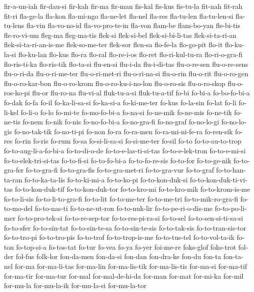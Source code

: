 {fir-a-un-iah fir-dau-si fir-kah fir-ma fir-man fis-kal fis-kus fis-tu-la
fit-nah fit-rah fit-ri fla-ge-la fla-kon fla-mi-ngo fla-ne-let fla-nel
fla-res fla-tu-len fla-tu-len-si fla-tu-lens fla-vin fla-vo-no-id
fla-vo-pro-te-in fla-von flam-be flam-bo-yan fle-bi-tis fle-ro-vi-um
fleg-ma fleg-ma-tis flek-si flek-si-bel flek-si-bi-li-tas flek-si-ta-ri-an
flek-si-ta-ri-an-is-me flek-so-me-ter flek-sor flen-sa flo-fe-la
flo-go-pit flo-it flo-ku-la-si flo-ku-lan flo-kus flo-ra flo-ral
flo-re-i-os flo-ret flo-ri-kul-tu-ra flo-ri-o-gra-fi flo-ris-ti-ka
flo-ris-tik flo-ta-si flu-en-si flu-i-da flu-i-di-tas flu-o-re-sen
flu-o-re-sens flu-o-ri-da flu-o-ri-me-ter flu-o-ri-met-ri flu-o-ri-na-si
flu-o-rin flu-o-rit flu-o-ro-gen flu-o-ro-kar-bon flu-o-ro-krom
flu-o-ro-ku-i-no-lon flu-o-ro-sis flu-o-ro-skop flu-o-ros-ko-pi flu-or
flu-ro-na flu-vi-al fluk-tu-a-si fluk-tu-a-tif fo-bi fo-bi-a fo-bo-fo-bi-a
fo-dak fo-fa fo-il fo-ka-li-sa-si fo-ka-si-a fo-ki-me-ter fo-kus fo-la-sin
fo-lat fo-li fo-li-kel fo-li-o fo-lo fo-mi-te fo-mo-fo-bi-a fo-na-si
fo-ne-mik fo-ne-mis fo-ne-tik fo-ne-tis fo-nem fo-nik fo-nis fo-no-fo-bi-a
fo-no-gra-fi fo-no-graf fo-no-lo-gi fo-no-lo-gis fo-no-tak-tik fo-no-ti-pi
fo-non fo-ra fo-ra-men fo-ra-mi-ni-fe-ra fo-ren-sik fo-res fo-rin fo-ris
fo-rum fo-sa fo-si-li-sa-si fo-si-me-ter fo-sil fo-to fo-to-au-to-trop
fo-to-aug-li-a-fo-bi-a fo-to-di-o-de fo-to-e-las-ti-si-tas
fo-to-e-lek-tron fo-to-e-mi-si fo-to-elek-tri-si-tas fo-to-fi-si
fo-to-fo-bi-a fo-to-fo-re-sis fo-to-for fo-to-ge-nik fo-to-gra-fer
fo-to-gra-fi fo-to-gra-fis fo-to-gra-met-ri fo-to-gra-vur fo-to-graf
fo-to-han-ta-ran fo-to-ka-ta-lis fo-to-ki-mi-a fo-to-ko-pi
fo-to-kon-duk-si fo-to-kon-duk-ti-vi-tas fo-to-kon-duk-tif
fo-to-kon-duk-tor fo-to-kro-mi fo-to-kro-mik fo-to-krom-is-me fo-to-li-sis
fo-to-li-to-gra-fi fo-to-lit fo-to-me-ter fo-to-me-tri fo-to-mik-ro-gra-fi
fo-to-mo-del fo-to-nas-ti fo-to-ne-ut-ron fo-to-nuk-lir
fo-to-pe-ri-o-dis-me fo-to-po-li-mer fo-to-pro-tek-si fo-to-re-sep-tor
fo-to-res-pi-ra-si fo-to-sel fo-to-sen-si-ti-sa-si fo-to-sfer
fo-to-sin-tat fo-to-sin-te-sa fo-to-sin-te-sis fo-to-tak-sis
fo-to-tran-sis-tor fo-to-tro-pi fo-to-tro-pis fo-to-trof fo-to-trop-is-me
fo-to-tus-tel fo-to-vol-ta-ik fo-ton fo-top-si-a fo-tos-tat fo-tur fo-vea
fo-ya fo-yer foi-me-re foks-glof foks-trot fol-der fol-fus folk-lor
fon-da-men fon-da-si fon-dan fon-dra-ke fon-du fon-ta fon-ta-nel for-ma
for-ma-li-tas for-ma-lin for-ma-lis-tik for-ma-lis-tis for-ma-si
for-ma-tif for-ma-tir for-ma-tur for-mal for-mal-de-hi-da for-man for-mat
for-mi-ka for-mil for-mu-la for-mu-la-ik for-mu-la-si for-mu-la-tor
}
